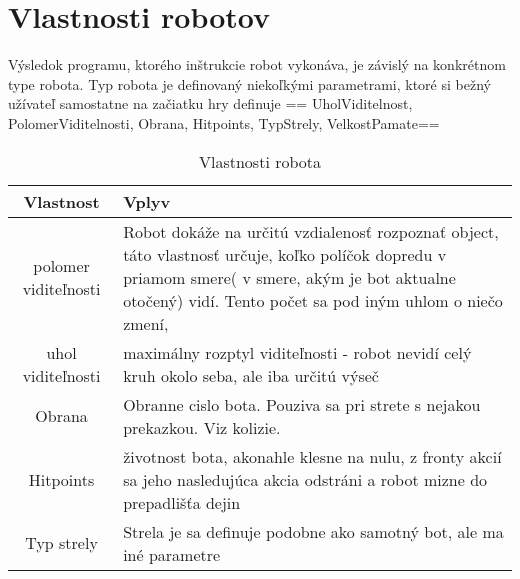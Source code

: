 \documentclass[a4paper,11pt,final]{report}
\begin{document}
\section{Vlastnosti robotov}
Výsledok programu, ktorého inštrukcie robot vykonáva, je závislý na konkrétnom type robota. Typ robota je definovaný niekoľkými parametrami, ktoré si bežný užívateľ samostatne na začiatku hry definuje == UholViditelnost, PolomerViditelnosti, Obrana, Hitpoints, TypStrely, VelkostPamate==\\
\begin{table}[ht]
\caption{Vlastnosti robota}   %
\centering                          %
\begin{tabular}{ | c | p{10cm} |}            %
\hline\hline                        %
Vlastnost & Vplyv \\   %
\hline                              %
polomer viditeľnosti & Robot dokáže na určitú vzdialenosť rozpoznať object, táto vlastnosť určuje, koľko políčok dopredu v priamom smere( v smere, akým je bot aktualne otočený) vidí. Tento počet sa pod iným uhlom o niečo zmení,\\\hline               %
uhol viditeľnosti & maximálny rozptyl viditeľnosti - robot nevidí celý kruh okolo seba, ale iba určitú výseč \\\hline
Obrana & Obranne cislo bota. Pouziva sa pri strete s nejakou prekazkou. Viz kolizie. \\\hline
Hitpoints  & životnost bota, akonahle klesne na nulu, z fronty akcií sa jeho nasledujúca akcia odstráni a robot mizne do prepadlišťa dejin\\\hline [1ex]         %
Typ strely & Strela je sa definuje podobne ako samotný bot, ale ma iné parametre\\\hline
\hline                              %
\end{tabular}
\label{table:vlastnosti}          %
\end{table}
\end{document}
